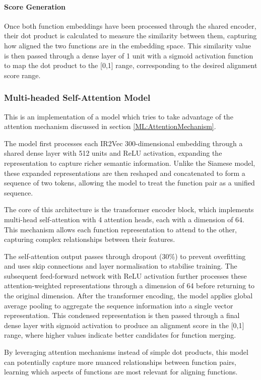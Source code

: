\paragraph{Score Generation}
Once both function embeddings have been processed through the shared encoder, their dot product is calculated to measure the similarity between them, capturing how aligned the two functions are in the embedding space. This similarity value is then passed through a dense layer of 1 unit with a sigmoid activation function to map the dot product to the [0,1] range, corresponding to the desired alignment score range.

\subsubsection{Multi-headed Self-Attention Model}
This is an implementation of a model which tries to take advantage of the attention mechanism discussed in section \ref{ML:AttentionMechanism}.

The model first processes each IR2Vec 300-dimensional embedding through a shared dense layer with 512 units and ReLU activation, expanding the representation to capture richer semantic information. Unlike the Siamese model, these expanded representations are then reshaped and concatenated to form a sequence of two tokens, allowing the model to treat the function pair as a unified sequence.

The core of this architecture is the transformer encoder block, which implements multi-head self-attention with 4 attention heads, each with a dimension of 64. This mechanism allows each function representation to attend to the other, capturing complex relationships between their features. 

The self-attention output passes through dropout (30\%) to prevent overfitting and uses skip connections and layer normalisation to stabilise training. The subsequent feed-forward network with ReLU activation further processes these attention-weighted representations through a dimension of 64 before returning to the original dimension. After the transformer encoding, the model applies global average pooling to aggregate the sequence information into a single vector representation. This condensed representation is then passed through a final dense layer with sigmoid activation to produce an alignment score in the [0,1] range, where higher values indicate better candidates for function merging.

By leveraging attention mechanisms instead of simple dot products, this model can potentially capture more nuanced relationships between function pairs, learning which aspects of functions are most relevant for aligning functions.


